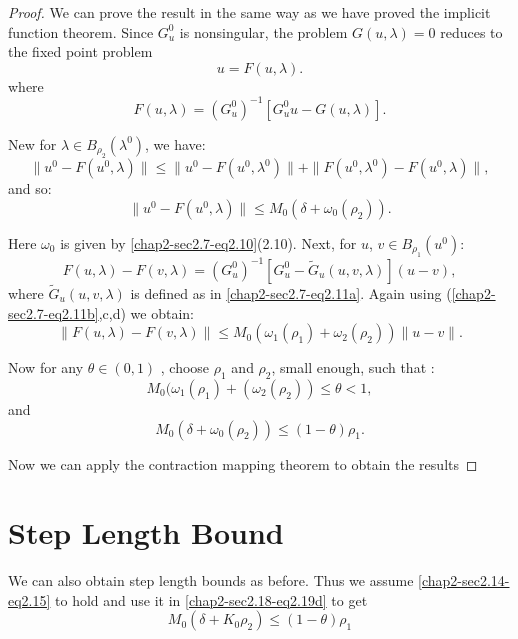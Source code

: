 \begin{proof}
We can prove the result in the same way as we have proved the implicit
function theorem. Since $G^0_u$ is nonsingular, the problem $G(u,
\lambda)= 0$ reduces to the fixed point problem  
$$
u= F(u, \lambda). 
$$\pageoriginale
where 
$$
F(u,\lambda)= (G^0_u)^{-1} [G^0_u u - G(u, \lambda)].  
$$

New for $\lambda \in B_{\rho_2}(\lambda^{0})$, we have: 
$$
\|u^0 - F (u^0 , \lambda)\| \leq \| u^0 - F (u^0, \lambda^0)\| + \| F
(u^0, \lambda^0) - F (u^0, \lambda)  \|,  
$$
and so: 
\begin{equation*}
\| u^0 - F(u^0, \lambda) \| \le M_0 (\delta +
\omega_0(\rho_2)). \tag{2.19a}\label{chap2-sec2.18-eq2.19a} 
\end{equation*}

Here $\omega_0$ is given by \eqref{chap2-sec2.7-eq2.10}(2.10). Next,
for $u$, $v \in B_{\rho_1}(u^0)$:  
$$
F(u,\lambda)- F(v, \lambda)= (G^0_u)^{-1} [G^0_u-\widetilde{G}_u (u, 
  v,\lambda)] (u-v),  
$$
where $\widetilde{G}_u(u, v, \lambda)$ is defined as in
\eqref{chap2-sec2.7-eq2.11a}. Again using
(\ref{chap2-sec2.7-eq2.11b},c,d) we obtain:  
\begin{equation*}
\|F(u, \lambda)- F(v, \lambda)\| \leq M_0 (\omega_1 (\rho_1)+
\omega_2(\rho_2))\|u-v\|.\tag{2.19b} \label{chap2-sec2.18-eq2.19b}
\end{equation*}

Now for any $\theta \in (0, 1)$ , choose $\rho_1$ and
$\rho_2$, small enough, such that : 
\begin{equation*}
M_0(\omega_1 (\rho_1)+(\omega_2 (\rho_2)) \leq \theta < 1,
\tag{2.19c}\label{chap2-sec2.18-eq2.19c} 
\end{equation*}
and
\begin{equation*}
M_0 (\delta + \omega_0(\rho_2)) \leq (1-\theta)
\rho_1. \tag{2.19d}\label{chap2-sec2.18-eq2.19d} 
\end{equation*}

Now we can apply the contraction mapping theorem to obtain the results  
\end{proof} 

\setcounter{section}{19}
\section{Step Length Bound}\label{chap2-sec2.20}

We can also obtain step length bounds as before. Thus we assume
\eqref{chap2-sec2.14-eq2.15} to hold and use it
in \eqref{chap2-sec2.18-eq2.19d} to get   
$$
M_0(\delta + K_0 \rho_2) \leq (1 - \theta) \rho_1 
$$\pageoriginale

